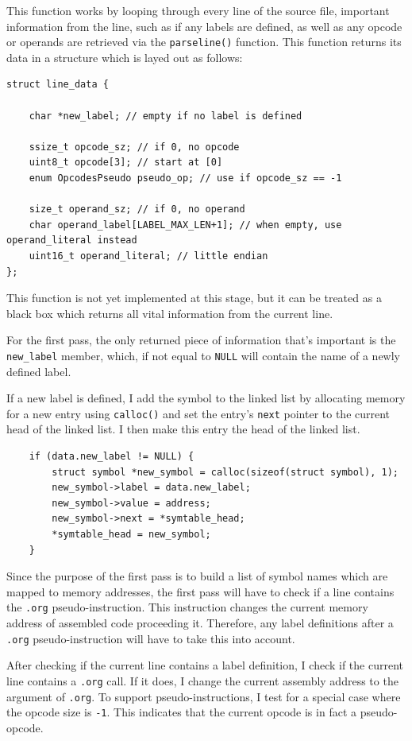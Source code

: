 \documentclass[a4paper]{report}
\begin{document}
This function works by looping through every line of the source file, important
information from the line, such as if any labels are defined, as well as any
opcode or operands are retrieved via the \texttt{parseline()} function. This
function returns its data in a structure which is layed out as follows:

\begin{lstlisting}
struct line_data {
	
	char *new_label; // empty if no label is defined

	ssize_t opcode_sz; // if 0, no opcode
	uint8_t opcode[3]; // start at [0]
	enum OpcodesPseudo pseudo_op; // use if opcode_sz == -1

	size_t operand_sz; // if 0, no operand
	char operand_label[LABEL_MAX_LEN+1]; // when empty, use operand_literal instead
	uint16_t operand_literal; // little endian
};
\end{lstlisting}

This function is not yet implemented at this stage, but it can be treated as a
black box which returns all vital information from the current line.

For the first pass, the only returned piece of information that's important is
the \texttt{new\_label} member, which, if not equal to \texttt{NULL} will
contain the name of a newly defined label.

If a new label is defined, I add the symbol to the linked list by allocating
memory for a new entry using \texttt{calloc()} and set the entry's \texttt{next}
pointer to the current head of the linked list. I then make this entry the
head of the linked list.

\begin{lstlisting}
	if (data.new_label != NULL) {
		struct symbol *new_symbol = calloc(sizeof(struct symbol), 1);
		new_symbol->label = data.new_label;
		new_symbol->value = address;
		new_symbol->next = *symtable_head;
		*symtable_head = new_symbol;
	}
\end{lstlisting}

Since the purpose of the first pass is to build a list of symbol names which are
mapped to memory addresses, the first pass will have to check if a line contains
the \texttt{.org} pseudo-instruction. This instruction changes the current
memory address of assembled code proceeding it. Therefore, any label definitions
after a \texttt{.org} pseudo-instruction will have to take this into account.

After checking if the current line contains a label definition, I check if the
current line contains a \texttt{.org} call. If it does, I change the current
assembly address to the argument of \texttt{.org}. To support
pseudo-instructions, I test for a special case where the opcode size is
\texttt{-1}. This indicates that the current opcode is in fact a pseudo-opcode.
\end{document}
